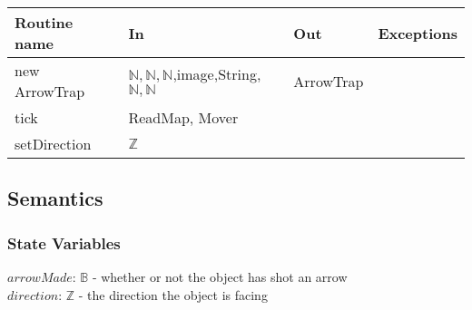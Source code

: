 \documentclass[12pt]{article}
\begin{document}
\begin{tabular}{| l | l | l | l |}
\hline
\textbf{Routine name} & \textbf{In} & \textbf{Out} & \textbf{Exceptions}\\
\hline
new ArrowTrap & $\mathbb{N}, \mathbb{N}, \mathbb{N}$,image,String,$\mathbb{N},\mathbb{N}$ & ArrowTrap & \\
\hline
tick & ReadMap, Mover & ~ & ~\\
\hline
setDirection & $\mathbb{Z}$ & ~ & ~\\
\hline
\end{tabular}

\subsection*{Semantics}

\subsubsection*{State Variables}

$arrowMade$: $\mathbb{B}$ - whether or not the object has shot an arrow\\
$direction$: $\mathbb{Z}$ - the direction the object is facing




\end{document}
